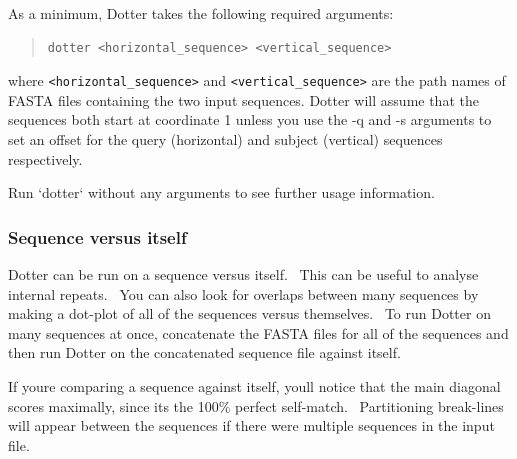 \documentclass[letterpaper]{article}
\begin{document}
As a minimum, Dotter takes the following required arguments:

\begin{quote}
\begin{verbatim}
dotter <horizontal_sequence> <vertical_sequence>
\end{verbatim}
\end{quote}

where \texttt{{\textless}horizontal\_sequence{\textgreater}} and
\texttt{{\textless}vertical\_sequence{\textgreater}} are the path names of FASTA
files containing the two input sequences.
Dotter will assume that the sequences both start at coordinate 1 unless
you use the {}-q and {}-s arguments to set an offset for the query
(horizontal) and subject (vertical) sequences respectively.

\bigskip

Run {\textquoteleft}dotter{\textquoteleft} without any arguments to see
further usage information.

{\color[rgb]{0.30980393,0.5058824,0.7411765}\subsubsection[Sequence versus itself]{Sequence versus itself}}
{Dotter can be run on a sequence versus itself. \ This can be useful to
analyse internal repeats. \ You can also look for overlaps between many
sequences by making a dot-plot of all of the sequences versus
themselves. \ To run Dotter on many sequences at once, concatenate the
FASTA files for all of the sequences and then run Dotter on the
concatenated sequence file against itself.}

\bigskip

{If you{\textquotesingle}re comparing a sequence against itself,
you{\textquotesingle}ll notice that the main diagonal scores maximally,
since it{\textquotesingle}s the 100\% perfect self-match.
\ Partitioning break-lines will appear between the sequences if there
were multiple sequences in the input file.}
\end{document}
